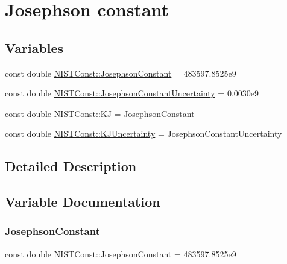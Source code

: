 \hypertarget{group___n_i_s_t_const-_josephson_constant}{}\section{Josephson constant}
\label{group___n_i_s_t_const-_josephson_constant}
\subsection*{Variables}
\begin{DoxyCompactItemize}
\item 
const double \hyperlink{group___n_i_s_t_const-_josephson_constant_gae9f3553a6a6c5eed3df61ad33277cab8}{N\+I\+S\+T\+Const\+::\+Josephson\+Constant} = 483597.\+8525e9
\item 
const double \hyperlink{group___n_i_s_t_const-_josephson_constant_gaa10eadf7c1811f94c5b5725ad300a099}{N\+I\+S\+T\+Const\+::\+Josephson\+Constant\+Uncertainty} = 0.\+0030e9
\item 
const double \hyperlink{group___n_i_s_t_const-_josephson_constant_ga75e8a1fd7b1434083e96c2f0291eb756}{N\+I\+S\+T\+Const\+::\+KJ} = Josephson\+Constant
\item 
const double \hyperlink{group___n_i_s_t_const-_josephson_constant_ga8501536b42a3f29278ec30b3bf054321}{N\+I\+S\+T\+Const\+::\+K\+J\+Uncertainty} = Josephson\+Constant\+Uncertainty
\end{DoxyCompactItemize}


\subsection{Detailed Description}


\subsection{Variable Documentation}
\mbox{\label{group___n_i_s_t_const-_josephson_constant_gae9f3553a6a6c5eed3df61ad33277cab8}} 
\subsubsection{\texorpdfstring{Josephson\+Constant}{JosephsonConstant}}
{\footnotesize\ttfamily const double N\+I\+S\+T\+Const\+::\+Josephson\+Constant = 483597.\+8525e9}

